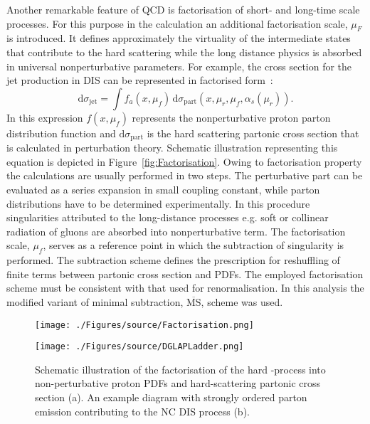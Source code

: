Another remarkable feature of QCD is factorisation of short- and long-time scale processes. For this purpose in the calculation an additional factorisation scale, $\mu_F$ is introduced. It defines approximately the virtuality of the intermediate states that contribute to the hard scattering while the long distance physics is absorbed in universal nonperturbative parameters. For example, the cross section for the jet production in DIS can be represented in factorised form~\cite{Collins Factorization of Hard Processes in}:
\begin{equation}
 \mathrm{d}\sigma_{\mathrm{jet}} = \int{f_a\left(x,\mu_f\right)}\, \mathrm{d}\sigma_{\mathrm{part}}\left(x,\mu_r, \mu_f, \alpha_s\left(\mu_r\right) \right).
\label{eq:disfactorisation}
\end{equation} 
In this expression $f\left(x,\mu_f\right)$ represents the nonperturbative proton parton distribution function and $\mathrm{d}\sigma_{\mathrm{part}}$ is the hard scattering partonic cross section that is calculated in perturbation theory. Schematic illustration representing this equation is depicted in Figure~\ref{fig:Factorisation}. Owing to factorisation property the calculations are usually performed in two steps. The perturbative part can be evaluated as a series expansion in small coupling constant, while parton distributions have to be determined experimentally. In this procedure singularities attributed to the long-distance processes e.g. soft or collinear radiation of gluons are absorbed into nonperturbative term. The factorisation scale, $\mu_f$, serves as a reference point in which the subtraction of singularity is performed. The subtraction scheme defines the prescription for reshuffling of finite terms between partonic cross section and PDFs. The employed factorisation scheme must be consistent with that used for renormalisation. In this analysis the modified variant of minimal subtraction, $\overline{\mathrm{MS}}$, scheme was used.
\begin{figure}[t]
	\centering
	\begin{subfloat}[]{
		\texttt{[image: ./Figures/source/Factorisation.png]}
		\label{fig:Factorisation}
	 }%
	\end{subfloat}
	\begin{subfloat}[]{
		\texttt{[image: ./Figures/source/DGLAPLadder.png]}
		\label{fig:DGLAPLadder}
	}%
	\end{subfloat}
	\caption{Schematic illustration of the factorisation of the hard \ep-process into non-perturbative proton PDFs and hard-scattering partonic cross section (a). An example diagram with strongly ordered parton emission contributing to the NC DIS process (b).}
	\label{fig:factorisationdglapladder}
\end{figure}
